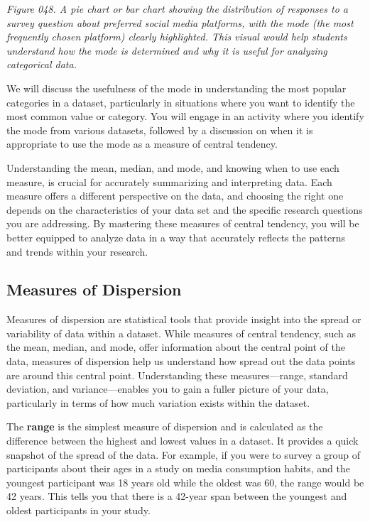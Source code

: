 \documentclass[
]{book}
\begin{document}
\emph{Figure 048. A pie chart or bar chart showing the distribution of responses to a survey question about preferred social media platforms, with the mode (the most frequently chosen platform) clearly highlighted. This visual would help students understand how the mode is determined and why it is useful for analyzing categorical data.}

We will discuss the usefulness of the mode in understanding the most popular categories in a dataset, particularly in situations where you want to identify the most common value or category. You will engage in an activity where you identify the mode from various datasets, followed by a discussion on when it is appropriate to use the mode as a measure of central tendency.

Understanding the mean, median, and mode, and knowing when to use each measure, is crucial for accurately summarizing and interpreting data. Each measure offers a different perspective on the data, and choosing the right one depends on the characteristics of your data set and the specific research questions you are addressing. By mastering these measures of central tendency, you will be better equipped to analyze data in a way that accurately reflects the patterns and trends within your research.

\subsection{Measures of Dispersion}\label{measures-of-dispersion}

Measures of dispersion are statistical tools that provide insight into the spread or variability of data within a dataset. While measures of central tendency, such as the mean, median, and mode, offer information about the central point of the data, measures of dispersion help us understand how spread out the data points are around this central point. Understanding these measures---range, standard deviation, and variance---enables you to gain a fuller picture of your data, particularly in terms of how much variation exists within the dataset.

The \textbf{range} is the simplest measure of dispersion and is calculated as the difference between the highest and lowest values in a dataset. It provides a quick snapshot of the spread of the data. For example, if you were to survey a group of participants about their ages in a study on media consumption habits, and the youngest participant was 18 years old while the oldest was 60, the range would be 42 years. This tells you that there is a 42-year span between the youngest and oldest participants in your study.
\end{document}
